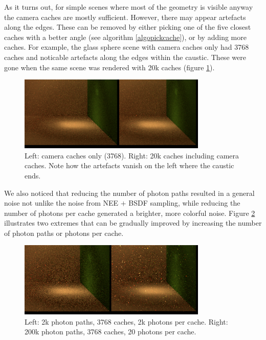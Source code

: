 As it turns out, for simple scenes where most of the geometry is visible anyway the camera caches are mostly sufficient. However, there may appear artefacts along the edges. These can be removed by either picking one of the five closest caches with a better angle (see algorithm \ref{algopickcache}), or by adding more caches. For example, the glass sphere scene with camera caches only had 3768 caches and noticable artefacts along the edges within the caustic. These were gone when the same scene was rendered with 20k caches (figure \ref{artefacts}).



 \begin{figure}[h!]
 \centering
 \includegraphics[width=0.8\textwidth]{bilder/kugelbox/caches/artefacts.png}
\caption{Left: camera caches only (3768).\newline
Right: 20k caches including camera caches.\newline
Note how the artefacts vanish on the left where the caustic ends.}
  \label{artefacts}\end{figure}

We also noticed that reducing the number of photon paths resulted in a general noise not unlike the noise from NEE $+$ BSDF sampling, while reducing the number of photons per cache generated a brighter, more colorful noise. Figure \ref{noises} illustrates two extremes that can be gradually improved by increasing the number of photon paths or photons per cache.


 \begin{figure}[h!]
 \centering
 \includegraphics[width=0.8\textwidth]{bilder/kugelbox/caches/different_noises.png}
\caption{Left: 2k photon paths, 3768 caches, 2k photons per cache.\newline
Right: 200k photon paths, 3768 caches, 20 photons per cache.}
  \label{noises}\end{figure}

